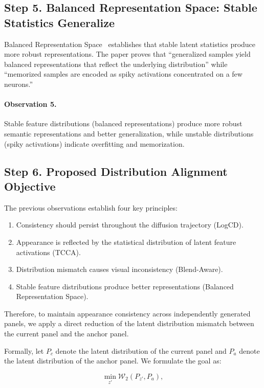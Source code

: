 \documentclass[12pt]{article}
\begin{document}
\subsection{Step 5. Balanced Representation Space: Stable Statistics Generalize}

Balanced Representation Space~\cite{ZhangICLR2026} establishes that stable latent statistics produce more robust representations. The paper proves that ``generalized samples yield balanced representations that reflect the underlying distribution'' while ``memorized samples are encoded as spiky activations concentrated on a few neurons.''

\paragraph{Observation 5.}
Stable feature distributions (balanced representations) produce more robust semantic representations and better generalization, while unstable distributions (spiky activations) indicate overfitting and memorization.

\subsection{Step 6. Proposed Distribution Alignment Objective}

The previous observations establish four key principles:

\begin{enumerate}
\item Consistency should persist throughout the diffusion trajectory (LogCD).
\item Appearance is reflected by the statistical distribution of latent feature activations (TCCA).
\item Distribution mismatch causes visual inconsistency (Blend-Aware).
\item Stable feature distributions produce better representations (Balanced Representation Space).
\end{enumerate}

Therefore, to maintain appearance consistency across independently generated panels, we apply a direct reduction of the latent distribution mismatch between the current panel and the anchor panel.

Formally, let $P_c$ denote the latent distribution of the current panel and $P_a$ denote the latent distribution of the anchor panel. We formulate the goal as:

\begin{equation}
\min_{z'} \mathcal{W}_2(P_{z'}, P_a),
\end{equation}
\end{document}

